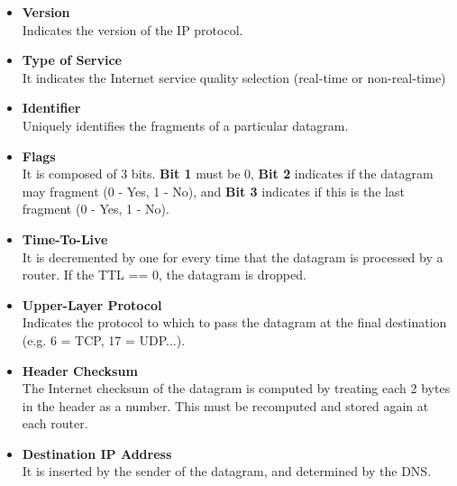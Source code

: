 \documentclass{article}
\begin{document}
\begin{itemize}
	\item \textbf{Version}
	\vspace{.2cm} \\
	Indicates the version of the IP protocol.
	
	\item \textbf{Type of Service}
	\vspace{.2cm} \\
	It indicates the Internet service quality selection (real-time or non-real-time)
	
	\item \textbf{Identifier}
	\vspace{.2cm} \\
	Uniquely identifies the fragments of a particular datagram.
	
	\item \textbf{Flags}
	\vspace{.2cm} \\
	It is composed of 3 bits. \textbf{Bit 1} must be 0, \textbf{Bit 2} indicates if the datagram may fragment (0 - Yes, 1 - No), and \textbf{Bit 3} indicates if this is the last fragment (0 - Yes, 1 - No).
	
	\item \textbf{Time-To-Live}
	\vspace{.2cm} \\
	It is decremented by one for every time that the datagram is processed by a router. If the TTL == 0, the datagram is dropped.
	
	\item \textbf{Upper-Layer Protocol}
	\vspace{.2cm} \\
	Indicates the protocol to which to pass the datagram at the final destination (e.g. 6 = TCP, 17 = UDP...).
	
	\item \textbf{Header Checksum}
	\vspace{.2cm} \\
	The Internet checksum of the datagram is computed by treating each 2 bytes in the header as a number. This must be recomputed and stored again at each router.
	
	\item \textbf{Destination IP Address}
	\vspace{.2cm} \\
	It is inserted by the sender of the datagram, and determined by the DNS.
\end{itemize}
\end{document}
